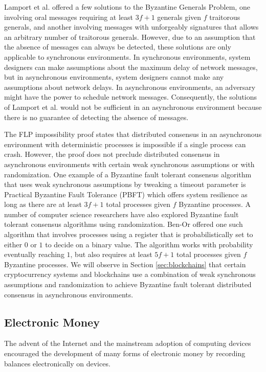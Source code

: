 Lamport et al. offered a few solutions to the Byzantine Generals Problem,
one involving oral messages requiring at least $3f + 1$ generals given $f$
traitorous generals, and another involving messages with unforgeably signatures
that allows an arbitrary number of traitorous generals. However, due to an
assumption that the absence of messages can always be detected, these solutions
are only applicable to synchronous environments. In synchronous environments,
system designers can make assumptions about the maximum delay of network
messages, but in asynchronous environments, system designers cannot make any
assumptions about network delays\cite{tendermint}. In asynchronous environments,
an adversary might have the power to schedule network messages. Consequently, the solutions
of Lamport et al. would not be sufficient in an asynchronous environment
because there is no guarantee of detecting the absence of messages.

The FLP impossibility proof states that distributed consensus in an asynchronous
environment with deterministic processes is impossible if a single process can
crash\cite{FLP}. However, the proof does not preclude distributed consensus in
asynchronous environments with certain weak synchronous assumptions or with
randomization. One example of a Byzantine fault tolerant consensus
algorithm that uses weak synchronous assumptions by tweaking a timeout parameter is Practical Byzantine Fault Tolerance (PBFT) which offers system
resilience as long as there are at least $3f + 1$ total processes given $f$ Byzantine processes\cite{pbft}. A number of computer
science researchers have also explored Byzantine fault tolerant consensus
algorithms using randomization. Ben-Or offered one such algorithm that involves
processes using a register that is probabilistically set to either $0$ or $1$ to
decide on a binary value. The algorithm works with probability eventually
reaching $1$, but also requires at least $5f + 1$ total processes given $f$
Byzantine processes\cite{freechoice}. We will observe in Section \ref{sec:blockchains}
that certain cryptocurrency systems and blockchains use a combination of weak
synchronous assumptions and randomization to achieve Byzantine fault tolerant
distributed consensus in asynchronous environments.

\subsection{Electronic Money}

The advent of the Internet and the mainstream adoption of computing devices
encouraged the development of many forms of electronic money by recording
balances electronically on devices.

